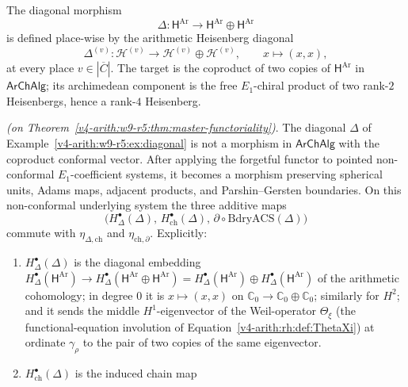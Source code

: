 \begin{example}
\label{v4-arith:w9-r5:ex:diagonal}
The diagonal morphism
\[
\Delta\colon\mathsf{H}^{\mathrm{Ar}}\longrightarrow
\mathsf{H}^{\mathrm{Ar}}\oplus\mathsf{H}^{\mathrm{Ar}}
\]
is defined place-wise by the arithmetic Heisenberg diagonal
\[
\Delta^{(v)}\colon\mathcal{H}^{(v)}\longrightarrow\mathcal{H}^{(v)}\oplus\mathcal{H}^{(v)},
\qquad x\longmapsto(x,x),
\]
at every place \(v\in|\overline{C}|\). The target is the coproduct of
two copies of \(\mathsf{H}^{\mathrm{Ar}}\) in \(\mathsf{ArChAlg}\); its
archimedean component is the free \(E_{1}\)-chiral product of two
rank-\(2\) Heisenbergs, hence a rank-\(4\) Heisenberg.
\end{example}

\begin{proposition}
\label{v4-arith:w9-r5:prop:diagonal-verification}
\ClaimStatusProvedHereConditional \emph{(on
Theorem~\ref{v4-arith:w9-r5:thm:master-functoriality})}. The diagonal
\(\Delta\) of Example~\ref{v4-arith:w9-r5:ex:diagonal} is not a morphism in
\(\mathsf{ArChAlg}\) with the coproduct conformal vector. After applying
the forgetful functor to pointed non-conformal \(E_{1}\)-coefficient
systems, it becomes a morphism preserving spherical units, Adams maps,
adjacent products, and Parshin--Gersten boundaries. On this
non-conformal underlying system the three additive maps
\[
\bigl(H^{\bullet}_{\Delta}(\Delta),\,H^{\bullet}_{\mathrm{ch}}(\Delta),\,\partial\circ\mathrm{BdryACS}(\Delta)\bigr)
\]
commute with \(\eta_{\Delta,\mathrm{ch}}\) and
\(\eta_{\mathrm{ch},\partial}\). Explicitly:
\begin{enumerate}
\item \(H^{\bullet}_{\Delta}(\Delta)\) is the diagonal embedding
\(H^{\bullet}_{\Delta}(\mathsf{H}^{\mathrm{Ar}})\to H^{\bullet}_{\Delta}(\mathsf{H}^{\mathrm{Ar}}\oplus\mathsf{H}^{\mathrm{Ar}})=H^{\bullet}_{\Delta}(\mathsf{H}^{\mathrm{Ar}})\oplus H^{\bullet}_{\Delta}(\mathsf{H}^{\mathrm{Ar}})\)
of the arithmetic cohomology; in degree \(0\) it is \(x\mapsto(x,x)\)
on \(\mathbb{C}_{0}\to\mathbb{C}_{0}\oplus\mathbb{C}_{0}\); similarly
for \(H^{2}\); and it sends the middle \(H^{1}\)-eigenvector of the Weil-operator
\(\Theta_{\xi}\) (the functional-equation involution of
Equation~\ref{v4-arith:rh:def:ThetaXi}) at ordinate \(\gamma_{\rho}\) to the
pair of two copies of the same eigenvector.
\item \(H^{\bullet}_{\mathrm{ch}}(\Delta)\) is the induced chain map

\end{enumerate}
\end{proposition}
